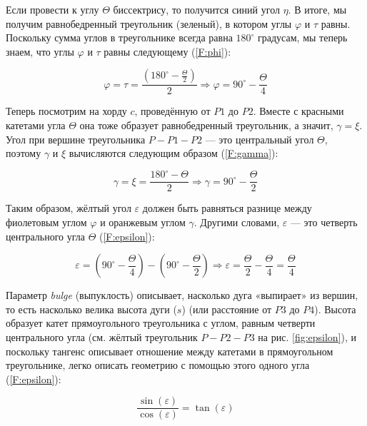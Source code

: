 Если провести к углу $\Theta$ биссектрису, то получится синий угол $\eta$. В итоге, мы получим равнобедренный треугольник (зеленый), в котором углы $\varphi$ и $\tau$ равны. Поскольку сумма углов в треугольнике всегда равна $180^{\circ}$ градусам, мы теперь знаем, что углы $\varphi$ и $\tau$ равны следующему (\ref{F:phi}):

\begin{equation}
	\varphi=\tau=\frac{(180^{\circ}-\frac{\Theta}{2})}{2}\Rightarrow\varphi=90^{\circ}-\frac{\Theta}{4}
	\label{F:phi}
\end{equation}

Теперь посмотрим на хорду $c$, проведённую от $P1$ до $P2$. Вместе с красными катетами угла $\Theta$ она тоже образует равнобедренный треугольник, а значит, $\gamma=\xi$. Угол при вершине треугольника $P-P1-P2$ --- это центральный угол $\Theta$, поэтому $\gamma$ и $\xi$ вычисляются следующим образом (\ref{F:gamma}):

\begin{equation}
	\gamma=\xi=\frac{180^{\circ}-\Theta}{2}\Rightarrow\gamma=90^{\circ}-\frac{\Theta}{2}
	\label{F:gamma}
\end{equation}

Таким образом, жёлтый угол $\varepsilon$ должен быть равняться разнице между фиолетовым углом $\varphi$ и оранжевым углом $\gamma$. Другими словами, $\varepsilon$ --- это четверть центрального угла $\Theta$ (\ref{F:epsilon}):

\begin{equation}
	\varepsilon=(90^{\circ}-\frac{\Theta}{4})-(90^{\circ}-\frac{\Theta}{2})\Rightarrow\varepsilon=\frac{\Theta}{2}-\frac{\Theta}{4}=\frac{\Theta}{4}
	\label{F:epsilon}
\end{equation}

Параметр \textit{bulge} (выпуклость) описывает, насколько дуга «выпирает» из вершин, то есть насколько велика высота дуги ($s$) (или расстояние от $P3$ до $P4$). Высота образует катет прямоугольного треугольника с углом, равным четверти центрального угла (см. жёлтый треугольник $P-P2-P3$ на рис. \ref{fig:epsilon}), и поскольку тангенс описывает отношение между катетами в прямоугольном треугольнике, легко описать геометрию с помощью этого одного угла (\ref{F:epsilon}):

\begin{equation}
	\frac{\sin(\varepsilon)}{\cos(\varepsilon)}=\tan(\varepsilon)
	\label{F:epsilon}
\end{equation}

